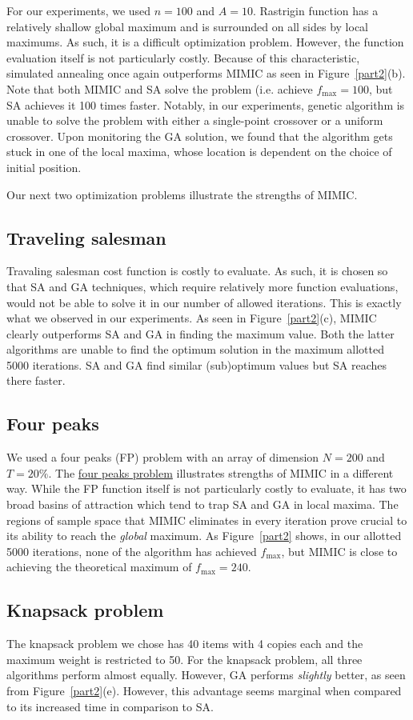 \documentclass[10pt,letterpaper]{article}
\begin{document}
For our experiments, we used $n=100$ and $A=10$. Rastrigin function has a relatively shallow global maximum and is surrounded on all sides by local maximums. As such, it is a difficult optimization problem. However, the function evaluation itself is not particularly costly. Because of this characteristic, simulated annealing once again outperforms MIMIC as seen in Figure~\ref{part2}(b). Note that both MIMIC and SA solve the problem (i.e. achieve $f_{\text{max}}=100$, but SA achieves it 100 times faster. Notably, in our experiments, genetic algorithm is unable to solve the problem with either a single-point crossover or a uniform crossover. Upon monitoring the GA solution, we found that the algorithm gets stuck in one of the local maxima, whose location is dependent on the choice of initial position.

Our next two optimization problems illustrate the strengths of MIMIC.
\subsection{Traveling salesman}
Travaling salesman cost function is costly to evaluate. As such, it is chosen so that SA and GA techniques, which require relatively more function evaluations, would not be able to solve it in our number of allowed iterations. This is exactly what we observed in our experiments. As seen in Figure~\ref{part2}(c), MIMIC clearly outperforms SA and GA in finding the maximum value. Both the latter algorithms are unable to find the optimum solution in the maximum allotted 5000 iterations. SA and GA find similar (sub)optimum values  but SA reaches there faster.
\subsection{Four peaks}
We used a four peaks (FP) problem with an array of dimension $N=200$ and $T = 20\%$. The \href{http://www.cc.gatech.edu/~isbell/tutorials/mimic-tutorial.pdf}{four peaks problem} illustrates strengths of MIMIC in a different way. While the FP function itself is not particularly costly to evaluate, it has two broad basins of attraction which tend to trap SA and GA in local maxima. The regions of sample space that MIMIC eliminates in every iteration prove crucial to its ability to reach the {\em global} maximum. As Figure~\ref{part2} shows, in our allotted 5000 iterations, none of the algorithm has achieved $f_{\text{max}}$, but MIMIC is close to achieving the theoretical maximum of $f_{\text{max}} = 240$. 
\subsection{Knapsack problem}
The knapsack problem we chose has 40 items with 4 copies each and the maximum weight is restricted to 50. For the knapsack problem, all three algorithms perform almost equally. However, GA performs {\em slightly} better, as seen from Figure~\ref{part2}(e). However, this advantage seems marginal when compared to its increased time in comparison to SA.
\end{document}
